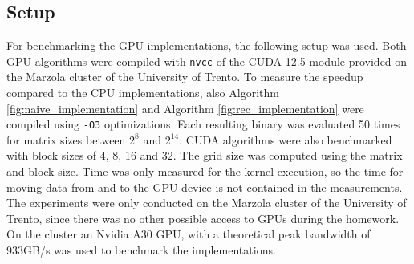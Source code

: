 \documentclass[conference]{IEEEtran}
\begin{document}
    \subsection{Setup}
    For benchmarking the GPU implementations, the following setup was used. Both GPU algorithms were compiled with \texttt{nvcc} of the CUDA 12.5 module provided on the Marzola cluster of the University of Trento. To measure the speedup compared to the CPU implementations, also Algorithm \ref{fig:naive_implementation} and Algorithm \ref{fig:rec_implementation} were compiled using \texttt{-O3} optimizations. Each resulting binary was evaluated 50 times for matrix sizes between $2^8$ and $2^{14}$. CUDA algorithms were also benchmarked with block sizes of 4, 8, 16 and 32. The grid size was computed using the matrix and block size. Time was only measured for the kernel execution, so the time for moving data from and to the GPU device is not contained in the measurements. The experiments were only conducted on the Marzola cluster of the University of Trento, since there was no other possible access to GPUs during the homework. On the cluster an Nvidia A30 GPU, with a theoretical peak bandwidth of 933GB/s was used to benchmark the implementations.
\end{document}
